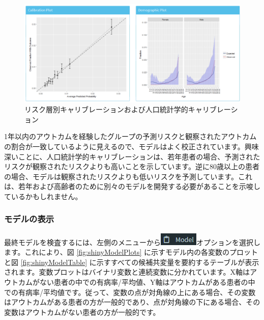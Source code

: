 \documentclass[
  11pt]{book}
\theoremstyle{definition}
\theoremstyle{definition}
\theoremstyle{definition}
\theoremstyle{definition}
\theoremstyle{remark}
\begin{document}
\begin{figure}

{\centering \includegraphics[width=1\linewidth]{images/PatientLevelPrediction/shiny/shinyPerformanceCal} 

}

\caption{リスク層別キャリブレーションおよび人口統計学的キャリブレーション}\label{fig:shinyPerformanceCal}
\end{figure}

1年以内のアウトカムを経験したグループの予測リスクと観察されたアウトカムの割合が一致しているように見えるので、モデルはよく校正されています。興味深いことに、人口統計学的キャリブレーションは、若年患者の場合、予測されたリスクが観察されたリスクよりも高いことを示しています。逆に80歳以上の患者の場合、モデルは観察されたリスクよりも低いリスクを予測しています。これは、若年および高齢者のために別々のモデルを開発する必要があることを示唆しているかもしれません。

\subsubsection*{モデルの表示}\label{ux30e2ux30c7ux30ebux306eux8868ux793a}

最終モデルを検査するには、左側のメニューから\includegraphics{images/PatientLevelPrediction/modelButton.png}オプションを選択します。これにより、図 \ref{fig:shinyModelPlots} に示すモデル内の各変数のプロットと図 \ref{fig:shinyModelTable} に示すすべての候補共変量を要約するテーブルが表示されます。変数プロットはバイナリ変数と連続変数に分かれています。X軸はアウトカムがない患者の中での有病率/平均値、Y軸はアウトカムがある患者の中での有病率/平均値です。従って、変数の点が対角線の上にある場合、その変数はアウトカムがある患者の方が一般的であり、点が対角線の下にある場合、その変数はアウトカムがない患者の方が一般的です。
\end{document}
